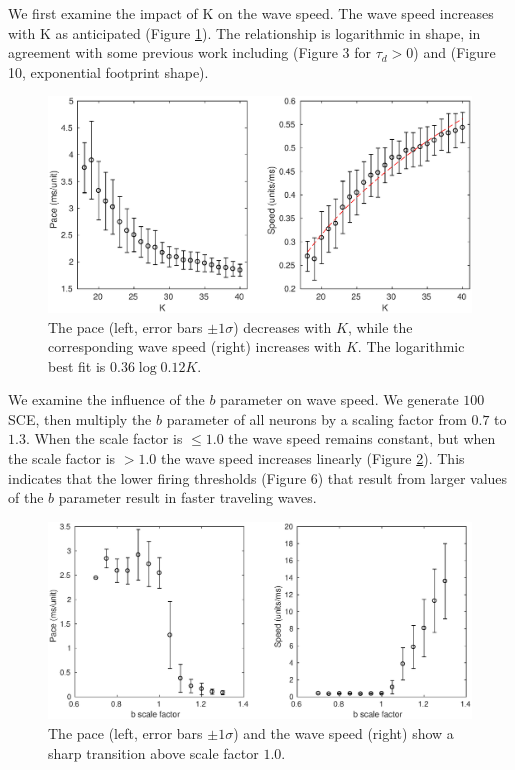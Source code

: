 We first examine the impact of K on the wave speed.
The wave speed increases with K as anticipated (Figure \ref{fig:delay_k}).
The relationship is logarithmic in shape, in agreement with some previous work including \citet{Golomb1999} (Figure 3 for $\tau_d>0$) and \citet{Golomb1996}(Figure 10, exponential footprint shape).
\begin{figure}[!htb]
 \centering
   \includegraphics[width=\textwidth]{fig/WaveSpeed_K}
   \caption{The pace (left, error bars $\pm 1 \sigma$) decreases with $K$, while the corresponding wave speed (right) increases with $K$. 
          The logarithmic best fit is $0.36\log{0.12K}$.}
   \label{fig:delay_k}
\end{figure}

We examine the influence of the $b$ parameter on wave speed.
We generate $100$ SCE, then multiply the $b$ parameter of all neurons by a scaling factor from $0.7$ to $1.3$.
When the scale factor is $\leq 1.0$ the wave speed remains constant, but when the scale factor is $>1.0$ the wave speed increases linearly (Figure \ref{fig:WaveSpeed_B}).
This indicates that the lower firing thresholds (Figure 6) that result from larger values of the $b$ parameter result in faster traveling waves.

\begin{figure}[!htb]
 \centering
   \includegraphics[width=\textwidth]{fig/WaveSpeed_B}
   \caption{The pace (left, error bars $\pm 1 \sigma$) and the wave speed (right) show a sharp transition above scale factor $1.0$. }
   \label{fig:WaveSpeed_B}
\end{figure}

